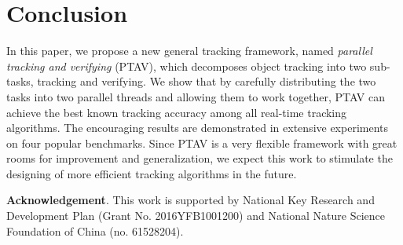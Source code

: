 \documentclass[10pt,twocolumn,letterpaper]{article}
\begin{document}
\section{Conclusion}

In this paper, we propose a new general tracking framework, named \emph{parallel tracking and verifying} (PTAV), which decomposes object tracking into two sub-tasks, tracking and verifying. We show that by carefully distributing the two tasks into two parallel threads and allowing them to work together, PTAV can achieve the best known tracking accuracy among all real-time tracking algorithms. The encouraging results are demonstrated in extensive experiments on four popular benchmarks. Since PTAV is a very flexible framework with great rooms for improvement and generalization, we expect this work to stimulate the designing of more efficient tracking algorithms in the future.

\small\vspace{1mm}\noindent\textbf{Acknowledgement}. This work is supported by National Key Research and Development Plan (Grant No. 2016YFB1001200) and National Nature Science Foundation of China (no. 61528204).

{\small


}
\end{document}
